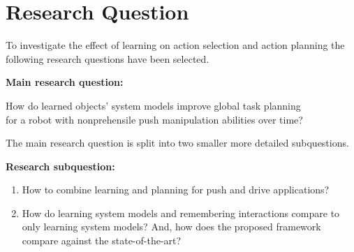 \begin{table}[H]
\begin{tabular}
\end{tabular}
\caption{Overview of 3 topics in recent literature and their object manipulation, where \textit{grasp-push} and \textit{grasp-pull} refer to prehensile push and pull manipulation, \textit{gripped} refers to fully gripping and lifting objects for manipulation, \textit{pushing} refers to nonprehensile push manipulation. The proposed framework shows \xmark/\cmark for learning system dynamics because it proposes system identification to generate a system model, however for the implementation an hardcoded system model is used.}%
\label{table:sota_and_3_topics}
\end{table}

\section{Research Question}%
\label{sec:research_question}
To investigate the effect of learning on action selection and action planning the following research questions have been selected.\bs

\textbf{Main research question:}
\begin{center}%
\label{researchquestion:main}
\large
How do learned objects' system models improve global task planning\\for a robot with nonprehensile push manipulation abilities over time?
\end{center}

The main research question is split into two smaller more detailed subquestions.\bs

\textbf{Research subquestion:}
\begin{enumerate}
    \item\label{researchsubquestion:does_it_work} How to combine learning and planning for push and drive applications?
    \item\label{researchsubquestion:does_it_compare} How do learning system models and remembering interactions compare to only learning system models? And, how does the proposed framework compare against the state-of-the-art?
\end{enumerate}

